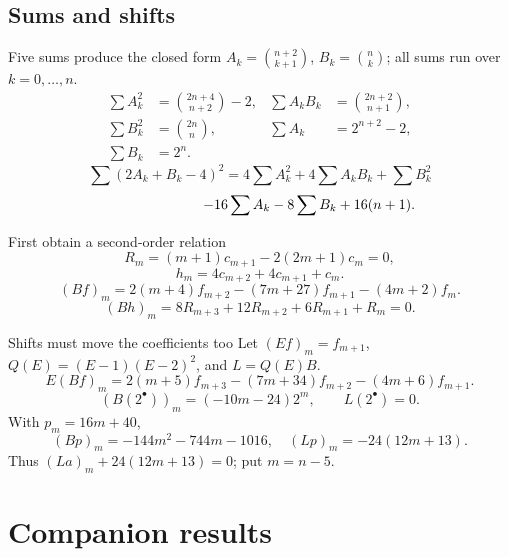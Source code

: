 \documentclass{beamer}
\begin{document}
\subsection{Sums and shifts}
\begin{frame}{Five sums produce the closed form}
\small
$A_k=\binom{n+2}{k+1}$, $B_k=\binom nk$; all sums run over $k=0,\ldots,n$.
\[
\begin{aligned}
\sum A_k^2&=\binom{2n+4}{n+2}-2,&\sum A_kB_k&=\binom{2n+2}{n+1},\\
\sum B_k^2&=\binom{2n}n,&\sum A_k&=2^{n+2}-2,\\
\sum B_k&=2^n.
\end{aligned}
\]
\[
\sum(2A_k+B_k-4)^2
=4\sum A_k^2+4\sum A_kB_k+\sum B_k^2
\]
\[
\hspace{25mm}-16\sum A_k-8\sum B_k+16(n+1).
\]
\end{frame}
\begin{frame}{First obtain a second-order relation}
\small
\[
R_m=(m+1)c_{m+1}-2(2m+1)c_m=0,
\]
\[
h_m=4c_{m+2}+4c_{m+1}+c_m.
\]
\[
(Bf)_m=2(m+4)f_{m+2}-(7m+27)f_{m+1}-(4m+2)f_m.
\]
\[
(Bh)_m=8R_{m+3}+12R_{m+2}+6R_{m+1}+R_m=0.
\]
\end{frame}
\begin{frame}{Shifts must move the coefficients too}
\small
Let $(Ef)_m=f_{m+1}$, $Q(E)=(E-1)(E-2)^2$, and $L=Q(E)B$.
\[
E(Bf)_m=2(m+5)f_{m+3}-(7m+34)f_{m+2}-(4m+6)f_{m+1}.
\]
\[
(B(2^\bullet))_m=(-10m-24)2^m,\qquad L(2^\bullet)=0.
\]
With $p_m=16m+40$,
\[
(Bp)_m=-144m^2-744m-1016,\quad (Lp)_m=-24(12m+13).
\]
Thus $(La)_m+24(12m+13)=0$; put $m=n-5$.
\end{frame}
\section[Companions]{Companion results}
\end{document}
